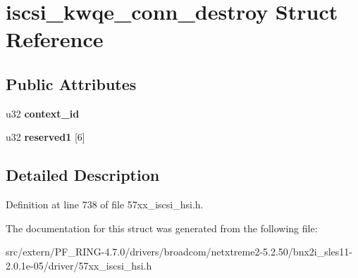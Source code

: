 \hypertarget{structiscsi__kwqe__conn__destroy}{
\section{iscsi\_\-kwqe\_\-conn\_\-destroy Struct Reference}
\label{structiscsi__kwqe__conn__destroy}
}
\subsection*{Public Attributes}
\begin{DoxyCompactItemize}
\item 
\hypertarget{structiscsi__kwqe__conn__destroy_a21715febb2485850b42cad1086b583e1}{
u32 {\bfseries context\_\-id}}
\label{structiscsi__kwqe__conn__destroy_a21715febb2485850b42cad1086b583e1}

\item 
\hypertarget{structiscsi__kwqe__conn__destroy_a55a74ffc4ccdb9866902aa8812d8d8ad}{
u32 {\bfseries reserved1} \mbox{[}6\mbox{]}}
\label{structiscsi__kwqe__conn__destroy_a55a74ffc4ccdb9866902aa8812d8d8ad}

\end{DoxyCompactItemize}


\subsection{Detailed Description}


Definition at line 738 of file 57xx\_\-iscsi\_\-hsi.h.



The documentation for this struct was generated from the following file:\begin{DoxyCompactItemize}
\item 
src/extern/PF\_\-RING-\/4.7.0/drivers/broadcom/netxtreme2-\/5.2.50/bnx2i\_\-sles11-\/2.0.1e-\/05/driver/57xx\_\-iscsi\_\-hsi.h\end{DoxyCompactItemize}
